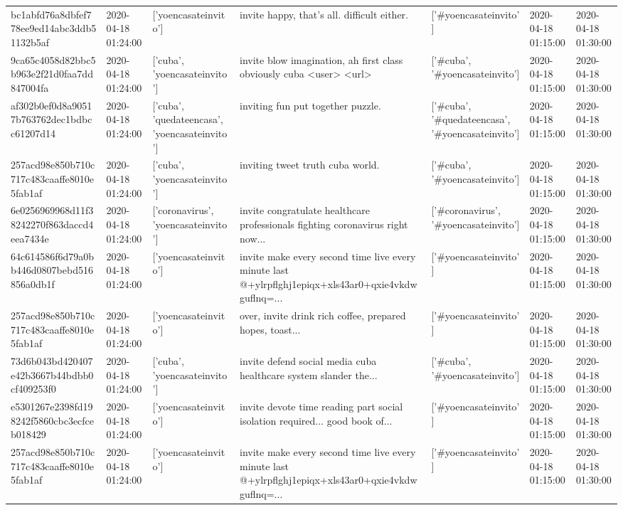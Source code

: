\begin{tabular}{lllllll}
bc1abfd76a8dbfef778ee9ed14abc3ddb51132b5af & 2020-04-18 01:24:00 & ['yoencasateinvito'] & invite happy, that's all. difficult either. & ['#yoencasateinvito'] & 2020-04-18 01:15:00 & 2020-04-18 01:30:00 \\
9ca65c4058d82bbc5b963e2f21d0faa7dd847004fa & 2020-04-18 01:24:00 & ['cuba', 'yoencasateinvito'] & invite blow imagination, ah first class obviously cuba <user> <url> & ['#cuba', '#yoencasateinvito'] & 2020-04-18 01:15:00 & 2020-04-18 01:30:00 \\
af302b0ef0d8a90517b763762dec1bdbcc61207d14 & 2020-04-18 01:24:00 & ['cuba', 'quedateencasa', 'yoencasateinvito'] & inviting fun put together puzzle. & ['#cuba', '#quedateencasa', '#yoencasateinvito'] & 2020-04-18 01:15:00 & 2020-04-18 01:30:00 \\
257acd98e850b710c717c483caaffe8010e5fab1af & 2020-04-18 01:24:00 & ['cuba', 'yoencasateinvito'] & inviting tweet truth cuba world. & ['#cuba', '#yoencasateinvito'] & 2020-04-18 01:15:00 & 2020-04-18 01:30:00 \\
6e0256969968d11f38242270f863daccd4eea7434e & 2020-04-18 01:24:00 & ['coronavirus', 'yoencasateinvito'] & invite congratulate healthcare professionals fighting coronavirus right now... & ['#coronavirus', '#yoencasateinvito'] & 2020-04-18 01:15:00 & 2020-04-18 01:30:00 \\
64c614586f6d79a0bb446d0807bebd516856a0db1f & 2020-04-18 01:24:00 & ['yoencasateinvito'] & invite make every second time live every minute last @+ylrpflghj1epiqx+xls43ar0+qxie4vkdwguflnq=... & ['#yoencasateinvito'] & 2020-04-18 01:15:00 & 2020-04-18 01:30:00 \\
257acd98e850b710c717c483caaffe8010e5fab1af & 2020-04-18 01:24:00 & ['yoencasateinvito'] & over, invite drink rich coffee, prepared hopes, toast... & ['#yoencasateinvito'] & 2020-04-18 01:15:00 & 2020-04-18 01:30:00 \\
73d6b043bd420407e42b3667b44bdbb0cf409253f0 & 2020-04-18 01:24:00 & ['cuba', 'yoencasateinvito'] & invite defend social media cuba healthcare system slander the... & ['#cuba', '#yoencasateinvito'] & 2020-04-18 01:15:00 & 2020-04-18 01:30:00 \\
e5301267e2398fd198242f5860cbc3ecfceb018429 & 2020-04-18 01:24:00 & ['yoencasateinvito'] & invite devote time reading part social isolation required... good book of... & ['#yoencasateinvito'] & 2020-04-18 01:15:00 & 2020-04-18 01:30:00 \\
257acd98e850b710c717c483caaffe8010e5fab1af & 2020-04-18 01:24:00 & ['yoencasateinvito'] & invite make every second time live every minute last @+ylrpflghj1epiqx+xls43ar0+qxie4vkdwguflnq=... & ['#yoencasateinvito'] & 2020-04-18 01:15:00 & 2020-04-18 01:30:00 \\

\end{tabular}

